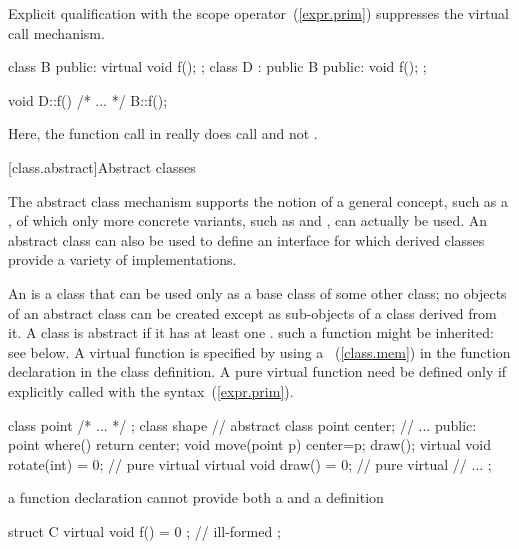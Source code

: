 \pnum
{}%
%
Explicit qualification with the scope operator~(\ref{expr.prim})
suppresses the virtual call mechanism.
\enterexample
\begin{codeblock}
class B { public: virtual void f(); };
class D : public B { public: void f(); };

void D::f() { /* ... */ B::f(); }
\end{codeblock}

Here, the function call in
really does call
and not
.
\exitexample

[class.abstract]{Abstract classes}%

\pnum
The abstract class mechanism supports the notion of a general concept,
such as a , of which only more concrete variants, such as
 and , can actually be used. An abstract
class can also be used to define an interface for which derived classes
provide a variety of implementations.

\pnum
An  is a class that can be used only
as a base class of some other class; no objects of an abstract class can
be created except as sub-objects of a class derived from it. A class is
abstract if it has at least one .
\enternote
such a function might be inherited: see below.
\exitnote
{}%
A virtual function is specified  by using a
~(\ref{class.mem}) in the function declaration
in the class definition.
%
A pure virtual function need be defined only if explicitly called with
the 
syntax~(\ref{expr.prim}).
\enterexample
{}%
\begin{codeblock}
class point { /* ... */ };
class shape {                   // abstract class
    point center;
    // ...
public:
    point where() { return center; }
    void move(point p) { center=p; draw(); }
    virtual void rotate(int) = 0;	// pure virtual
    virtual void draw() = 0;		// pure virtual
    // ...
};
\end{codeblock}
\exitexampleb
\enternote
a function declaration cannot provide both a 
and a definition
\exitnoteb
\enterexample
\begin{codeblock}
struct C {
	virtual void f() = 0 { };	// ill-formed
};
\end{codeblock}
\exitexampleb

